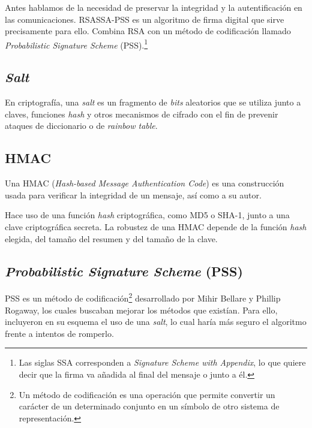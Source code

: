 \label{RSASSA-PSS}

Antes hablamos de la necesidad de preservar la integridad y la autentificación en las comunicaciones. RSASSA-PSS es un algoritmo de firma digital que sirve precisamente para ello. Combina RSA con un método de codificación llamado \emph{Probabilistic Signature Scheme} (PSS).\footnote{Las siglas SSA corresponden a \emph{Signature Scheme with Appendix}, lo que quiere decir que la firma va añadida al final del mensaje o junto a él.}

\subsection{\emph{Salt}}

En criptografía, una \emph{salt} es un fragmento de \emph{bits} aleatorios que se utiliza junto a claves, funciones \emph{hash} y otros mecanismos de cifrado con el fin de prevenir ataques de diccionario o de \emph{rainbow table}. \emph{\parencite{Reference32}}

\subsection{HMAC}

\label{HMAC}

Una HMAC (\emph{Hash-based Message Authentication Code}) es una construcción usada para verificar la integridad de un mensaje, así como a su autor.

Hace uso de una función \emph{hash} criptográfica, como MD5 o SHA-1, junto a una clave criptográfica secreta. La robustez de una HMAC depende de la función \emph{hash} elegida, del tamaño del resumen y del tamaño de la clave. \emph{\parencite{Reference31}}

\subsection{\emph{Probabilistic Signature Scheme} (PSS)}

\label{PSS}

PSS es un método de codificación\footnote{Un método de codificación es una operación que permite convertir un carácter de un determinado conjunto en un símbolo de otro sistema de representación.} desarrollado por Mihir Bellare y Phillip Rogaway, los cuales buscaban mejorar los métodos que existían. Para ello, incluyeron en su esquema el uso de una \emph{salt}, lo cual haría más seguro el algoritmo frente a intentos de romperlo. \emph{\parencite{Reference15}}

